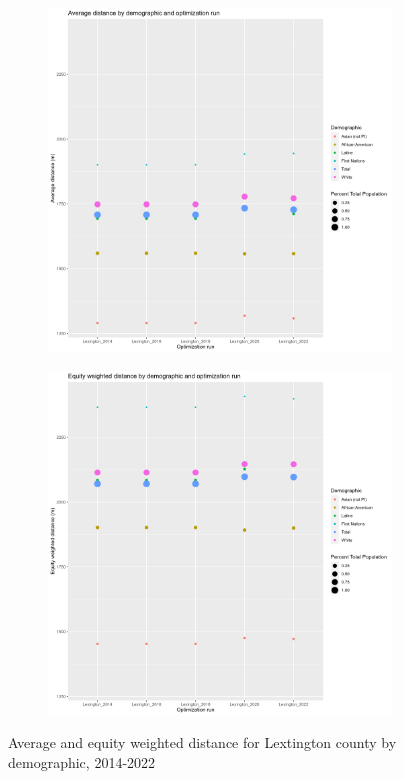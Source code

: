 \documentclass[11pt]{article}
\theoremstyle{remark}
\theoremstyle{definition}
\begin{document}
\begin{figure}
	\begin{subfigure}{.8\textwidth}
		\centering
		\includegraphics[width=.8\linewidth]{result_analysis/Lexington_County_SC_original_configs/orig_pop_scaled_avg}
		\label{sfig:Lexington avg dist}
	\end{subfigure} \newline
	\begin{subfigure}{.8\textwidth}
		\centering
		\includegraphics[width=.8\linewidth]{result_analysis/Lexington_County_SC_original_configs/orig_pop_scaled_y_EDE}
		\label{sfig:Lexington equity dist}
	\end{subfigure}
	\caption{Average and equity weighted distance for Lextington county by demographic, 2014-2022}
	\label{fig:Lexington distance graphs}
\end{figure}
\end{document}
